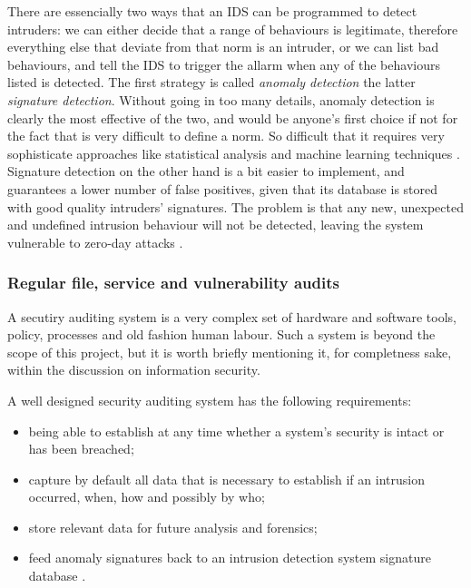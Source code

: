 There are essencially two ways that an IDS can be programmed to detect
intruders: we can either decide that a range of behaviours is legitimate,
therefore everything else that deviate from that norm is an intruder, or we can
list bad behaviours, and tell the IDS to trigger the allarm when any of the
behaviours listed is detected. The first strategy is called \emph{anomaly
detection} the latter \emph{signature detection}. Without going in too many
details, anomaly detection is clearly the most effective of the two, and would
be anyone's first choice if not for the fact that is very difficult to define a
norm. So difficult that it requires very sophisticate approaches like
statistical analysis and machine learning techniques \cite{GT09}. Signature
detection on the other hand is a bit easier to implement, and guarantees a lower
number of false positives, given that its database is stored with good quality
intruders' signatures. The problem is that any new, unexpected and undefined
intrusion behaviour will not be detected, leaving the system vulnerable to
zero-day attacks \cite{WS15}.

\subsubsection{Regular file, service and vulnerability audits}
A secutiry auditing system is a very complex set of hardware and software tools,
policy, processes and old fashion human labour. Such a system is beyond the scope of
this project, but it is worth briefly mentioning it, for completness sake,
within the discussion on information security.

A well designed security auditing system has the following requirements:
\begin{itemize}
  \item being able to establish at any time whether a system's security is
  intact or has been breached;
  \item capture by default all data that is necessary to establish if an
  intrusion occurred, when, how and possibly by who;
  \item store relevant data for future analysis and forensics;
  \item feed anomaly signatures back to an intrusion detection system signature
  database \cite{WS15}.
\end{itemize}

